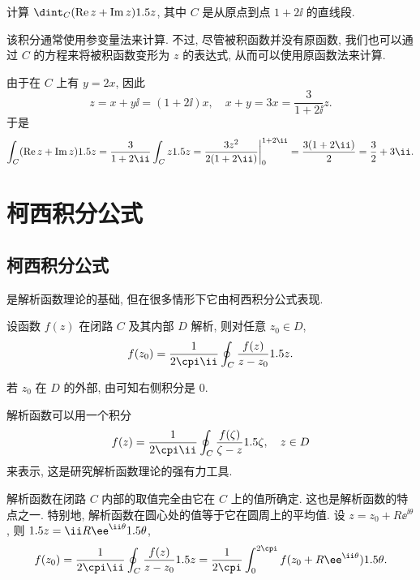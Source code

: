 \begin{example}
  计算 $\dint_C(\Re z+\Im z)\d z$, 其中 $C$ 是从原点到点 $1+2\ii$ 的直线段.
\end{example}

该积分通常使用参变量法来计算.
不过, 尽管被积函数并没有原函数, 我们也可以通过 $C$ 的方程来将被积函数变形为 $z$ 的表达式, 从而可以使用原函数法来计算.

\begin{solution}
  由于在 $C$ 上有 $y=2x$, 因此
  \[
    z=x+y\ii=(1+2\ii)x,\quad
    x+y=3x=\frac{3}{1+2\ii}z.
  \]
  于是
  \[
      \int_C(\Re z+\Im z)\d z
    =\frac{3}{1+2\ii}\int_C z\d z
    =\frac{3z^2}{2(1+2\ii)}\bigg|_0^{1+2\ii}
    =\frac{3(1+2\ii)}{2}
    =\frac32+3\ii.
  \]
\end{solution}



\section{柯西积分公式}

\subsection{柯西积分公式}

\thmCG 是解析函数理论的基础, 但在很多情形下它由柯西积分公式表现.

\begin{theorem}[柯西积分公式]
  \label{thm:Cauchy-integral}
  设函数 $f(z)$ 在闭路 $C$ 及其内部 $D$ 解析, 则对任意 $z_0\in D$,
  \[
    f(z_0)=\frac1{2\cpi\ii}\oint_C\frac{f(z)}{z-z_0}\d z.
  \]
\end{theorem}

若 $z_0$ 在 $D$ 的外部, 由\thmCG 可知右侧积分是 $0$.

解析函数可以用一个积分
\[
  f(z)=\frac1{2\cpi\ii}\oint_C\frac{f(\zeta)}{\zeta-z}\d\zeta,\quad z\in D
\]
来表示, 这是研究解析函数理论的强有力工具.

解析函数在闭路 $C$ 内部的取值完全由它在 $C$ 上的值所确定. 这也是解析函数的特点之一.
特别地, 解析函数在圆心处的值等于它在圆周上的平均值.
设 $z=z_0+R\ee^{\ii \theta}$, 则 $\d z=\ii R\ee^{\ii \theta}\d\theta$,
\[
  f(z_0)=\frac1{2\cpi\ii}\oint_C\frac{f(z)}{z-z_0}\d z=\frac1{2\cpi}\int_0^{2\cpi}f(z_0+R\ee^{\ii \theta})\d\theta.
\]

